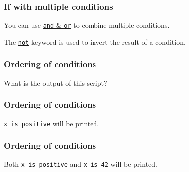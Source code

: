 \documentclass{beamer}
\newcommand{\hrefu}[2]{\underline{\href{#1}{#2}}}
\begin{document}
\begin{frame}
  \frametitle{If with multiple conditions}
  You can use \hrefu{https://www.w3schools.com/python/python_operators.asp}{\texttt{and} \& \texttt{or}} to combine multiple conditions.
  
  The \hrefu{https://www.w3schools.com/python/ref_keyword_not.asp}{\texttt{not}} keyword is used to invert the result of a condition.
\end{frame}
\begin{frame}
  \frametitle{Ordering of conditions}
  
  \vspace{5mm}
  What is the output of this script?
\end{frame}
\begin{frame}
  \frametitle{Ordering of conditions}
  
  \vspace{5mm}
  \texttt{x is positive} will be printed.
\end{frame}
\begin{frame}
  \frametitle{Ordering of conditions}
  
  \vspace{5mm}
  Both \texttt{x is positive} and \texttt{x is 42} will be printed.
\end{frame}
\end{document}
